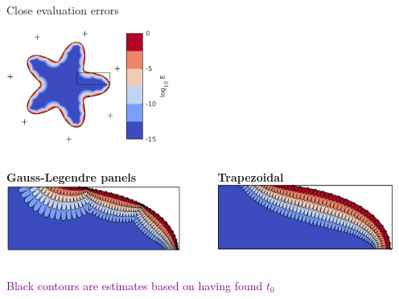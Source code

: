 \documentclass[t]{beamer}
\newcommand{\com}[1]{{\scriptsize \textcolor{purple}{#1}}}      %
\begin{document}
\begin{frame}{Close evaluation errors}
  \begin{center}
    \includegraphics[width=0.4\textwidth]{fig/aqbx_double_lyr_err}
  \begin{columns}[t]
    \begin{column}{0.5\textwidth}
      \begin{center}
        \textbf{Gauss-Legendre panels}\\
        \vspace{1em}
      \includegraphics[width=0.9\textwidth]{fig/aqbx_double_lyr_err_zoom}
    \end{center}
    \end{column}
    \vrule{}
    \begin{column}{0.5\textwidth}
      \begin{center}
        \textbf{Trapezoidal}\\
        \vspace{1em}
      \includegraphics[width=0.9\textwidth]{fig/trapz_complex_zoom}
    \end{center}
    \end{column}
  \end{columns}

\end{center}
\com{Black contours are estimates based on having found $t_0$}
\end{frame}
\end{document}
